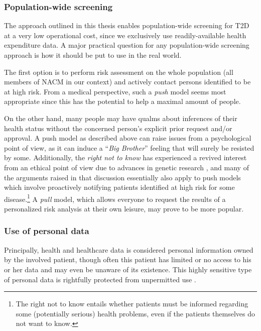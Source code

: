 \subsubsection{Population-wide screening}

The approach outlined in this thesis enables population-wide screening for T2D at a very low operational cost, since we exclusively use readily-available health expenditure data. A major practical question for any population-wide screening approach is how it should be put to use in the real world. 

The first option is to perform risk assessment on the whole population (all members of NACM in our context) and actively contact persons identified to be at high risk. From a medical perspective, such a \emph{push} model seems most appropriate since this has the potential to help a maximal amount of people. 

On the other hand, many people may have qualms about inferences of their health status without the concerned person's explicit prior request and/or approval. A push model as described above can raise issues from a psychological point of view, as it can induce a ``\emph{Big Brother}'' feeling that will surely be resisted by some. Additionally, the \emph{right not to know} has experienced a revived interest from an ethical point of view due to advances in genetic research \citep{ost1984right, andorno2004right, chadwick2014right}, and many of the arguments raised in that discussion essentially also apply to push models which involve proactively notifying patients identified at high risk for some disease.\footnote{The right not to know entails whether patients must be informed regarding some (potentially serious) health problems, even if the patients themselves do not want to know.} A \emph{pull} model, which allows everyone to request the results of a personalized risk analysis at their own leisure, may prove to be more popular. 

\subsubsection{Use of personal data}

Principally, health and healthcare data is considered personal information owned by the involved patient, though often this patient has limited or no access to his or her data and may even be unaware of its existence. This highly sensitive type of personal data is rightfully protected from unpermitted use \citep{privacywet,eu_data}.

